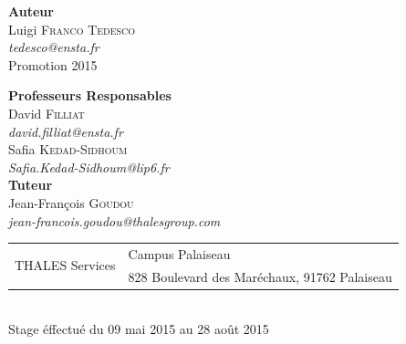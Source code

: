 \begin{titlepage}
\begin{center}
		\begin{minipage}{0.4\textwidth}
			\begin{flushleft} \large
				\textbf{Auteur}\\
				Luigi \textsc{Franco Tedesco}\\
				      \textit{tedesco@ensta.fr}\\
				Promotion 2015
			\end{flushleft}
		\end{minipage}
		\begin{minipage}{0.55\textwidth}
			\begin{flushright} \large
				\textbf{Professeurs Responsables} \\
				David \textsc{Filliat} \\
				\textit{david.filliat@ensta.fr}\\[0.1cm]
				Safia \textsc{Kedad-Sidhoum} \\
				\textit{Safia.Kedad-Sidhoum@lip6.fr}\\[0.1cm]
				\textbf{Tuteur} \\
				Jean-François \textsc{Goudou} \\
				\textit{jean-francois.goudou@thalesgroup.com}\\
			\end{flushright}
		\end{minipage}

		\vfill

		\begin{tabular}{r|l}
			\multirow{2}{*}{THALES Services}& Campus Palaiseau\\
			       & 828 Boulevard des Maréchaux, 91762 Palaiseau 
		\end{tabular}\\[1cm]
		Stage éffectué du 09 mai 2015 au 28 août 2015\\[0.2cm]
	\end{center}

\end{titlepage}


